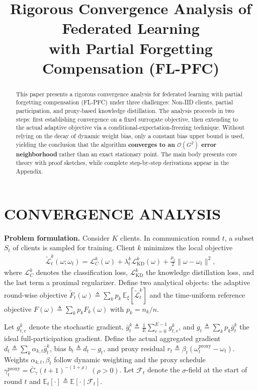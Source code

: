 \documentclass[journal]{IEEEtran}
\title{\textbf{Rigorous Convergence Analysis of Federated Learning\\ with Partial Forgetting Compensation (FL-PFC)}}
\author{}
\date{}
\begin{document}
\maketitle

\begin{abstract}
This paper presents a rigorous convergence analysis for federated learning with partial forgetting compensation (FL-PFC) under three challenges: Non-IID clients, partial participation, and proxy-based knowledge distillation. The analysis proceeds in two steps: first establishing convergence on a fixed surrogate objective, then extending to the actual adaptive objective via a conditional-expectation-freezing technique. Without relying on the decay of dynamic weight bias, only a constant bias upper bound is used, yielding the conclusion that the algorithm \textbf{converges to an \(\mathcal{O}(G^{2})\) error neighborhood} rather than an exact stationary point. The main body presents core theory with proof sketches, while complete step-by-step derivations appear in the Appendix.
\end{abstract}

\section{CONVERGENCE ANALYSIS}

\noindent\textbf{Problem formulation.}
Consider \(K\) clients. In communication round \(t\), a subset \(S_t\) of clients is sampled for training. Client \(k\) minimizes the local objective
\begin{align}
  \widetilde{\mathcal L}_t^k(\omega;\omega_t)
  = \mathcal L_C^k(\omega)
  + \lambda_t^k \mathcal L_{\mathrm{KD}}^k(\omega)
  + \frac{\mu_t}{2}\|\omega-\omega_t\|^2,
  \label{eq:1}
\end{align}
where \(\mathcal L_C^k\) denotes the classification loss, \(\mathcal L_{\mathrm{KD}}^k\) the knowledge distillation loss, and the last term a proximal regularizer.
Define two analytical objects: the adaptive round-wise objective \(\widetilde F_t(\omega) \triangleq \sum_k p_k\,\mathbb E_\xi[\widetilde{\mathcal L}_t^k]\) and the time-uniform reference objective \(F(\omega) \triangleq \sum_k p_k F_k(\omega)\) with \(p_k = n_k / n\).

Let \(g_{t,e}^k\) denote the stochastic gradient, \(\bar g_t^k \triangleq \frac{1}{E}\sum_{e=0}^{E-1}g_{t,e}^k\), and \(g_t \triangleq \sum_k p_k \bar g_t^k\) the ideal full-participation gradient.
Define the actual aggregated gradient \(d_t \triangleq \sum_k \alpha_{k,t}\bar g_t^k\), bias \(b_t \triangleq d_t - g_t\), and proxy residual \(r_t \triangleq \beta_t(\omega_t^{\mathrm{proxy}} - \omega_t)\).
Weights \(\alpha_{k,t}, \beta_t\) follow dynamic weighting and the proxy schedule \(\gamma_t^{\mathrm{proxy}} = \bar C_\gamma (t+1)^{-(1+\rho)}\;(\rho > 0)\).
Let \(\mathcal F_t\) denote the \(\sigma\)-field at the start of round \(t\) and \(\mathbb E_t[\cdot] \triangleq \mathbb E[\cdot \mid \mathcal F_t]\).
\end{document}
